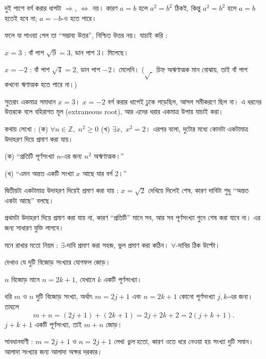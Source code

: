 \documentclass[11pt]{article}
\begin{document}
\begin{sol}
দুই পাশে বর্গ করার ধাপটা $\Rightarrow$, $\Leftrightarrow$ নয়। কারণ $a = b$
হলে $a^2 = b^2$ ঠিকই, কিন্তু $a^2 = b^2$ হলে $a = b$ হতেই হবে না; $a = -b$-ও
হতে পারে।

ফলে যা পাওয়া গেল তা ``সম্ভাব্য উত্তর'', নিশ্চিত উত্তর নয়। যাচাই করি :

$x = 3$ : বাঁ পাশ $\sqrt{9} = 3$, ডান পাশ $3$। মিলেছে।

$x = -2$ : বাঁ পাশ $\sqrt{4} = 2$, ডান পাশ $-2$। মেলেনি। ($\sqrt{\;}$ চিহ্ন
অঋণাত্মক মান বোঝায়, তাই বাঁ পাশ কখনো ঋণাত্মক হতে পারে না।)

সুতরাং একমাত্র সমাধান $x = 3$। $x = -2$ বর্গ করার ধাপেই ঢুকে পড়েছিল, আসল
সমীকরণে ছিল না। এ ধরনের উত্তরকে বলে বহিরাগত মূল (extraneous root), আর এদের
ধরার একমাত্র উপায় যাচাই করা।
\end{sol}

 কথায় লেখো :
(ক) $\forall n \in \mathbb{Z}, \; n^2 \geq 0$ \quad
(খ) $\exists x, \; x^2 = 2$।
এরপর বলো, দুটোর মধ্যে কোনটা একটামাত্র উদাহরণ দিয়ে প্রমাণ করা যায়।

\begin{sol}
(ক) ``প্রতিটি পূর্ণসংখ্যা $n$-এর জন্য $n^2$ অঋণাত্মক।''

(খ) ``এমন অন্তত একটি সংখ্যা $x$ আছে যার বর্গ $2$।''

দ্বিতীয়টা একটামাত্র উদাহরণ দিয়েই প্রমাণ করা যায় : $x = \sqrt{2}$ দেখিয়ে দিলেই
শেষ, কারণ দাবিটা শুধু ``অন্তত একটা আছে'' বলছে।

প্রথমটা উদাহরণ দিয়ে প্রমাণ করা যায় না, কারণ ``প্রতিটি'' মানে সব, আর সব
পূর্ণসংখ্যা গুনে শেষ করা যাবে না। এর জন্য সাধারণ যুক্তি লাগবে।

\medskip
মনে রাখার মতো নিয়ম : $\exists$-দাবি প্রমাণ করা সহজ, ভুল প্রমাণ করা কঠিন।
$\forall$-দাবির ঠিক উল্টো।
\end{sol}

 দেখাও যে দুটি বিজোড় সংখ্যার যোগফল জোড়।

\begin{sol}
$n$ বিজোড় মানে $n = 2k + 1$, যেখানে $k$ একটি পূর্ণসংখ্যা।

ধরি $m$ ও $n$ দুটি বিজোড় সংখ্যা, অর্থাৎ $m = 2j + 1$ এবং $n = 2k + 1$ কোনো
পূর্ণসংখ্যা $j, k$-এর জন্য। তাহলে
\[
  m + n = (2j+1) + (2k+1) = 2j + 2k + 2 = 2(j + k + 1) .
\]
$j + k + 1$ একটি পূর্ণসংখ্যা, তাই $m+n$ জোড়।

\medskip
সাবধানবাণী : $m = 2j+1$ ও $n = 2j+1$ লেখা \emph{ভুল} হতো, কারণ ওতে ধরে নেওয়া
হয় সংখ্যা দুটি সমান। আলাদা সংখ্যার জন্য আলাদা অক্ষর দরকার।
\end{sol}
\end{document}
